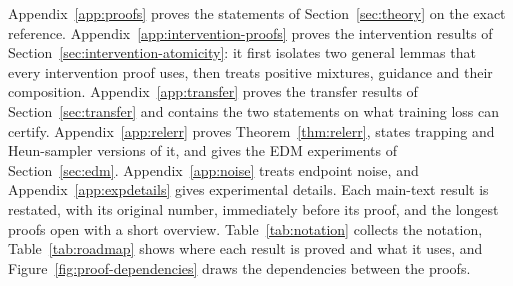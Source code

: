 \documentclass{article} %
\theoremstyle{plain}
\theoremstyle{definition}
\theoremstyle{remark}
\begin{document}
Appendix~\ref{app:proofs} proves the statements of Section~\ref{sec:theory} on the exact
reference. Appendix~\ref{app:intervention-proofs} proves the intervention results of
Section~\ref{sec:intervention-atomicity}: it first isolates two general lemmas that every
intervention proof uses, then treats positive mixtures, guidance and their composition.
Appendix~\ref{app:transfer} proves the transfer results of Section~\ref{sec:transfer} and contains
the two statements on what training loss can certify. Appendix~\ref{app:relerr} proves
Theorem~\ref{thm:relerr}, states trapping and Heun-sampler versions of it, and gives the EDM
experiments of Section~\ref{sec:edm}. Appendix~\ref{app:noise} treats endpoint
noise, and Appendix~\ref{app:expdetails} gives experimental details. Each main-text result is
restated, with its original number, immediately before its proof, and the longest proofs open
with a short overview. Table~\ref{tab:notation} collects the notation,
Table~\ref{tab:roadmap} shows where each result is proved and what it uses, and
Figure~\ref{fig:proof-dependencies} draws the dependencies between the proofs.
\end{document}
